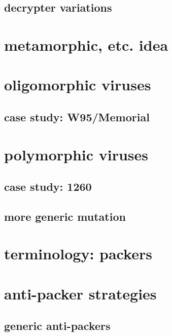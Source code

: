 \subsection{decrypter variations}


\section{metamorphic, etc. idea}


\section{oligomorphic viruses}


\subsection{case study: W95/Memorial}


\section{polymorphic viruses}


\subsection{case study: 1260}


\subsection{more generic mutation}


\section{terminology: packers}


\section{anti-packer strategies} %
\subsection{generic anti-packers}



